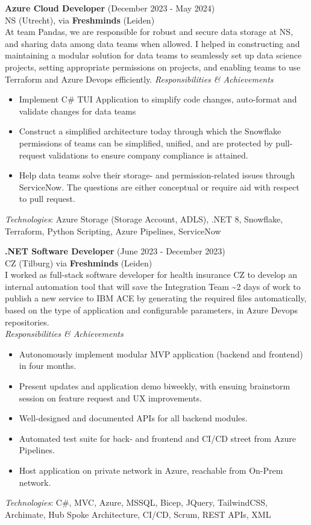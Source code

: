 \documentclass[a4paper,8pt]{article}
\begin{document}
\textbf{Azure Cloud Developer} (December 2023 - May 2024) \\
NS (Utrecht), via \textbf{Freshminds} (Leiden) \\
  At team Pandas, we are responsible for robust and secure data storage at NS,
  and sharing data among data teams when allowed. I helped in constructing and maintaining a modular solution for data teams to seamlessly set up data science projects, setting appropriate permissions on projects, and enabling teams to use Terraform and Azure Devops efficiently.
  \textit{Responsibilities \& Achievements}
  \begin{itemize}
    \item Implement C\# TUI Application to simplify code changes, auto-format and validate changes for data teams
    \item Construct a simplified architecture today through which the Snowflake permissions of teams can be simplified, unified, and are protected by pull-request validations to ensure company compliance is attained.
    \item Help data teams solve their storage- and permission-related issues through ServiceNow. The questions are either conceptual or require aid with respect to pull request.
  \end{itemize}
\textit{Technologies}: Azure Storage (Storage Account, ADLS), .NET 8, Snowflake, Terraform, Python Scripting, Azure Pipelines, ServiceNow
	
\textbf{.NET Software Developer} (June 2023 - December 2023) \\
CZ (Tilburg) via \textbf{Freshminds} (Leiden) \\
I worked as full-stack software developer for health insurance CZ to develop an internal automation tool that will save the Integration Team \textasciitilde 2 days of work to publish a new service to IBM ACE by generating the required files automatically, based on the type of application and configurable parameters, in Azure Devops repositories. \\
\textit{Responsibilities \& Achievements}
\begin{itemize}
    \item Autonomously implement modular MVP application (backend and frontend) in four months.
    \item Present updates and application demo biweekly, with ensuing brainstorm session on feature request and UX improvements.
    \item Well-designed and documented APIs for all backend modules.
    \item Automated test suite for back- and frontend and CI/CD street from Azure Pipelines.
    \item Host application on private network in Azure, reachable from On-Prem network.
\end{itemize}
\textit{Technologies}: C\#, MVC, Azure, MSSQL, Bicep, JQuery, TailwindCSS, Archimate, Hub Spoke Architecture, CI/CD, Scrum, REST APIs, XML
\end{document}
